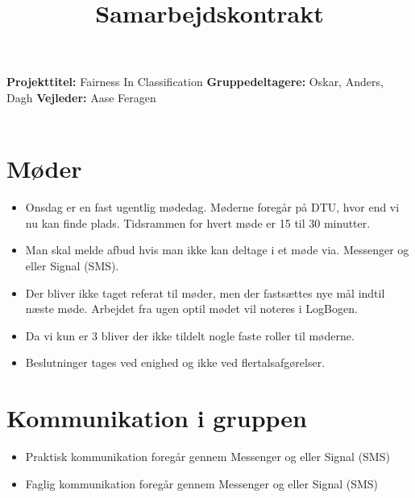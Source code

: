 \documentclass[11pt, fleqn]{article}
\title{Samarbejdskontrakt}
\date{}
\begin{document}
	\maketitle
	\noindent
	\vspace*{-1.4cm}
	\noindent
	\textbf{Projekttitel:} Fairness In Classification \newline \noindent
	\textbf{Gruppedeltagere:} Oskar, Anders, Dagh \newline  \noindent
	\textbf{Vejleder:} Aase Feragen \noindent
	\\\\
	\section{Møder}
	\begin{itemize}
		\item Onsdag er en fast ugentlig mødedag. Møderne foregår på DTU, hvor end vi nu kan finde plads. Tidsrammen for hvert møde er 15 til 30 minutter. 
		
		\item Man skal melde afbud hvis man ikke kan deltage i et møde via. Messenger og eller Signal (SMS).
		
		\item Der bliver ikke taget referat til møder, men der fastsættes nye mål indtil næste møde. Arbejdet fra ugen optil mødet vil noteres i LogBogen. 
		
		\item Da vi kun er 3 bliver der ikke tildelt nogle faste roller til møderne. 
		
		\item Beslutninger tages ved enighed og ikke ved flertalsafgørelser. 
	\end{itemize}
	
	\section{Kommunikation i gruppen}
	\begin{itemize}
		\item Praktisk kommunikation foregår gennem Messenger og eller Signal (SMS)
		
		\item Faglig kommunikation foregår gennem Messenger og eller Signal (SMS)
	\end{itemize}
	
\end{document}
